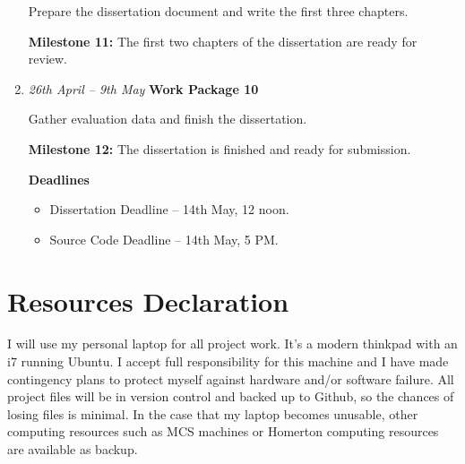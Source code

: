 \documentclass[a4paper,12pt]{article}
\begin{document}
\begin{enumerate}[label=\textbf{Slot \arabic*} -,start = 0]
 Prepare the dissertation document and write the first three chapters.

 \textbf{Milestone 11:} The first two chapters of the dissertation are ready for review.

 \item
 \emph{26th April -- 9th May} \hfill \textbf{Work Package 10}

 Gather evaluation data and finish the dissertation.

 \textbf{Milestone 12:} The dissertation is finished and ready for submission.

 \textbf{Deadlines}
 \begin{itemize}
  \item
  Dissertation Deadline -- 14th May, 12 noon.
  \item
  Source Code Deadline -- 14th May, 5 PM.
 \end{itemize}
\end{enumerate}

\section{Resources Declaration}

I will use my personal laptop for all project work. It's a modern thinkpad with an i7 running Ubuntu.
I accept full responsibility for this machine and I have made contingency plans to protect myself against hardware and/or software failure.
All project files will be in version control and backed up to Github, so the chances of losing files is minimal.
In the case that my laptop becomes unusable, other computing resources such as MCS machines or Homerton computing resources are available as backup.
\end{document}
